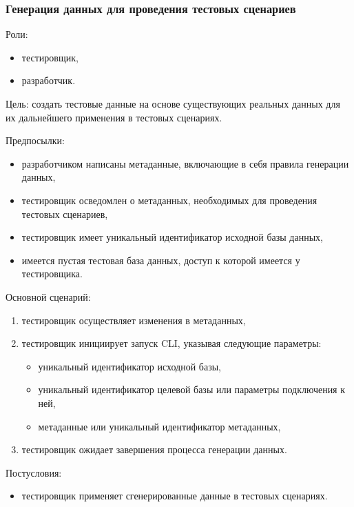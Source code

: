 \subsubsection{Генерация данных для проведения тестовых сценариев}

Роли:

\begin{itemize}
    \item тестировщик,
    \item разработчик.
\end{itemize}

Цель: создать тестовые данные на основе существующих реальных данных для их дальнейшего применения в тестовых сценариях.

Предпосылки:

\begin{itemize}
    \item разработчиком написаны метаданные, включающие в себя правила генерации данных,
    \item тестировщик осведомлен о метаданных, необходимых для проведения тестовых сценариев,
    \item тестировщик имеет уникальный идентификатор исходной базы данных,
    \item имеется пустая тестовая база данных, доступ к которой имеется у тестировщика.
\end{itemize}

Основной сценарий:

\begin{enumerate}
    \item тестировщик осуществляет изменения в метаданных,
    \item тестировщик инициирует запуск CLI, указывая следующие параметры:
    \begin{itemize}
        \item уникальный идентификатор исходной базы,
        \item уникальный идентификатор целевой базы или параметры подключения к ней,
        \item метаданные или уникальный идентификатор метаданных,
    \end{itemize}
    \item тестировщик ожидает завершения процесса генерации данных.
\end{enumerate}

Постусловия:

\begin{itemize}
    \item тестировщик применяет сгенерированные данные в тестовых сценариях.
\end{itemize}

